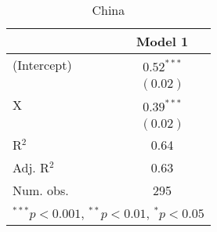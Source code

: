






\begin{kframe}
\begin{alltt}
\hlstd{(} \hlopt{~}   \hlopt{==}\hlstd{),}  \hlstd{=} \hlstd{)}
\end{alltt}
\end{kframe}
\begin{table}
\begin{center}
\begin{tabular}{l c }
\hline
            & Model 1 \\
\hline
(Intercept) & $0.52^{***}$ \\
            & $(0.02)$     \\
X           & $0.39^{***}$ \\
            & $(0.02)$     \\
\hline
R$^2$       & 0.64         \\
Adj. R$^2$  & 0.63         \\
Num. obs.   & 295          \\
\hline
\multicolumn{2}{l}{\scriptsize{$^{***}p<0.001$, $^{**}p<0.01$, $^*p<0.05$}}
\end{tabular}
\caption{China}
\label{table:coefficients}
\end{center}
\end{table}

